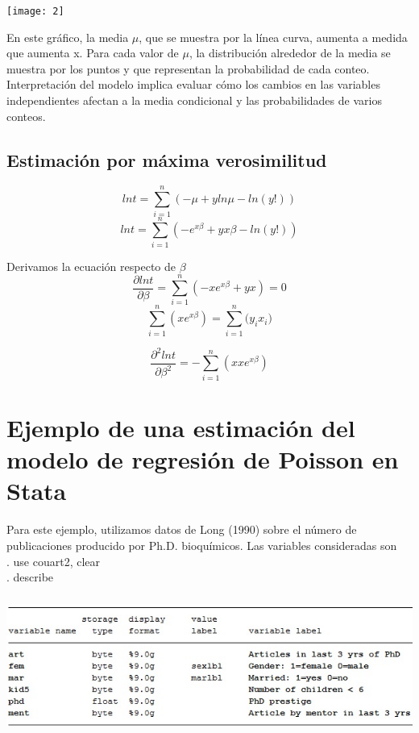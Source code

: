 \documentclass[11pt,fleqn]{book} %
\numberwithin{equation}{section} %
\numberwithin{figure}{section} %
\numberwithin{table}{section} %
\begin{document}
\begin{center}
\texttt{[image: 2]}
\end{center}

En este gráfico, la media  $\mu$, que se muestra por la línea curva, aumenta a medida que aumenta x. Para cada valor de  $\mu$, la distribución alrededor de la media se muestra por los puntos y que representan la probabilidad de cada conteo. Interpretación del modelo implica evaluar cómo los cambios en las variables independientes afectan a la media condicional y las probabilidades de varios conteos.

\subsection{Estimación por máxima verosimilitud }
\begin{equation}
lnt =\sum_{i=1}^{n}({-\mu+yln\mu-ln(y!)})
\end{equation}
\begin{equation}
lnt=\sum_{i=1}^{n}({-e^{x\beta}+yx\beta-ln(y!)})
\end{equation}

Derivamos la ecuación respecto de $\beta$
\begin{equation}
\frac{\partial lnt }{\partial \beta}=\sum_{i=1}^{n}({-xe^{x\beta}+yx})=0
\end{equation}
\begin{equation}
\sum_{i=1}^{n}({xe^{x\beta}})=\sum_{i=1}^{n}{(y_{i}x_{i}})
\end{equation}

\begin{equation}
\frac{\partial^2 lnt }{\partial \beta^2}= -\sum_{i=1}^{n}({xxe^{x\beta}})
\end{equation}

\section{Ejemplo de una estimación del modelo de regresión de Poisson en Stata}

Para este ejemplo, utilizamos datos de Long (1990) sobre el número de publicaciones producido por Ph.D. bioquímicos. Las variables consideradas son\\
. use couart2, clear\\
. describe\\

\begin{center}
\includegraphics[height=4.5cm]{3}
\end{center}
\end{document}
